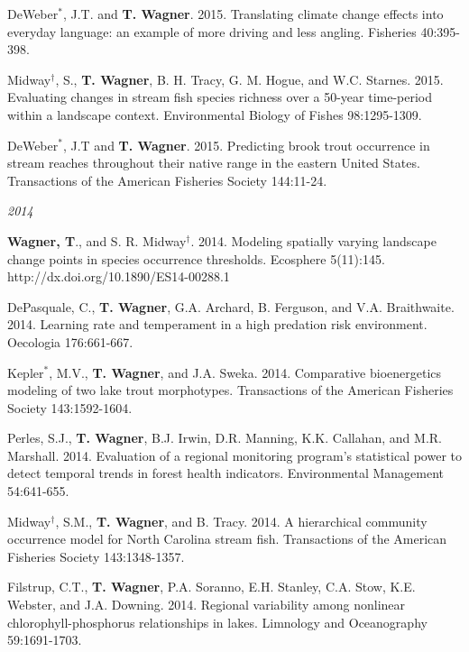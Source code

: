 \documentclass[10pt]{article}
\begin{document}
\begin{flushleft}
\begin{etaremune}[start=48]
\item DeWeber$^*$, J.T. and {\bf T. Wagner}. 2015. Translating climate change effects into everyday language: an example of more driving and less angling. Fisheries 40:395-398.

\item Midway$^\dagger$, S., {\bf T. Wagner}, B. H. Tracy, G. M. Hogue, and W.C. Starnes. 2015. Evaluating changes in stream fish species richness over a 50-year time-period within a landscape context. Environmental Biology of Fishes 98:1295-1309.

\item DeWeber$^*$, J.T and {\bf T. Wagner}. 2015. Predicting brook trout occurrence in stream reaches throughout their native range in the eastern United States. Transactions of the American Fisheries Society 144:11-24. 

\end{etaremune}
\emph{2014}
\begin{etaremune}[start=41]
\item {\bf Wagner, T}., and S. R. Midway$^\dagger$. 2014. Modeling spatially varying landscape change points in species occurrence thresholds. Ecosphere 5(11):145. http://dx.doi.org/10.1890/ES14-00288.1 

\item DePasquale, C., {\bf T. Wagner}, G.A. Archard, B. Ferguson, and V.A. Braithwaite. 2014. Learning rate and temperament in a high predation risk environment. Oecologia 176:661-667. 

\item Kepler$^*$, M.V., {\bf T. Wagner}, and J.A. Sweka. 2014. Comparative bioenergetics modeling of two lake trout morphotypes. Transactions of the American Fisheries Society 143:1592-1604.

\item Perles, S.J., {\bf T. Wagner}, B.J. Irwin, D.R. Manning, K.K. Callahan, and M.R. Marshall. 2014. Evaluation of a regional monitoring program's statistical power to detect temporal trends in forest health indicators. Environmental Management 54:641-655.

\item Midway$^\dagger$, S.M., {\bf T. Wagner}, and B. Tracy. 2014. A hierarchical community occurrence model for North Carolina stream fish. Transactions of the American Fisheries Society 143:1348-1357.

\item Filstrup, C.T., {\bf T. Wagner}, P.A. Soranno, E.H. Stanley, C.A. Stow, K.E. Webster, and J.A. Downing. 2014. Regional variability among nonlinear chlorophyll-phosphorus relationships in lakes. Limnology and Oceanography 59:1691-1703. 


\end{etaremune}
\end{flushleft}
\end{document}
